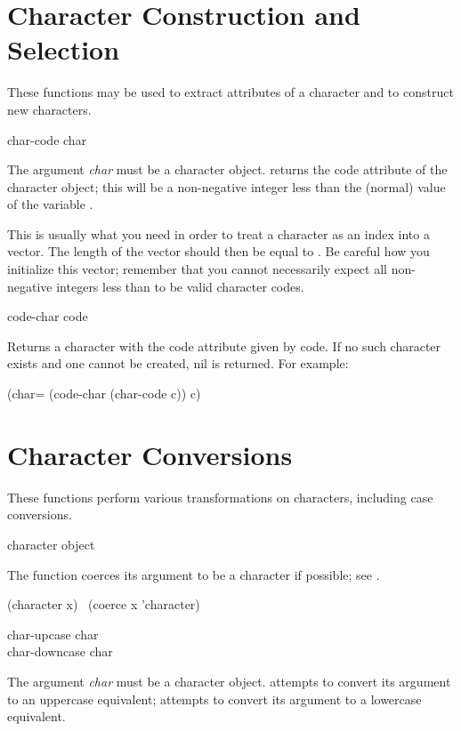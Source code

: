 \section{Character Construction and Selection}

These functions may be used to extract attributes of a character
and to construct new characters.

\begin{defun}[Function]
char-code char

The argument \emph{char} must be a character object.
 returns the code attribute of the character object;
this will be a non-negative integer less than the (normal) value of
the variable .

This is usually what you need in order to treat a character as an
index into a vector.  The length of the vector should then be
equal to .  Be careful how you initialize this
vector; remember that you cannot necessarily
expect all non-negative integers less than
 to be valid character codes.
\end{defun}

\begin{defun}[Function]
code-char code

Returns a character with the code attribute given by code. If no such character
exists and one cannot be created, nil is returned.
For example:
\begin{lisp}
(char= (code-char (char-code c)) c)
\end{lisp}
\end{defun}

\section{Character Conversions}

These functions perform various transformations on characters,
including case conversions.

\begin{defun}[Function]
character object

The function  coerces its argument to be a character
if possible; see .
\begin{lisp}
(character x) \EQ\ (coerce x 'character)
\end{lisp}
\end{defun}

\begin{defun}[Function]
char-upcase char \\
char-downcase char

The argument \emph{char} must be a character object.
 attempts to convert its argument to an uppercase
equivalent;  attempts to convert its argument
to a lowercase equivalent.
\end{defun}

